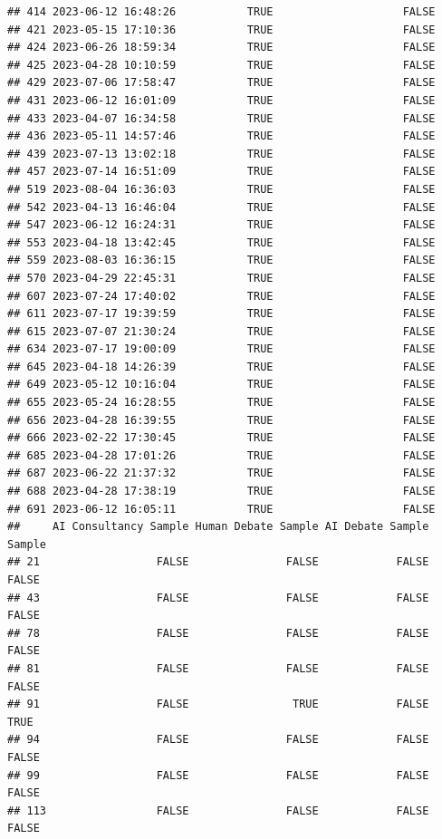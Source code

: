 \documentclass[
]{article}
\begin{document}
\begin{verbatim}
## 414 2023-06-12 16:48:26           TRUE                    FALSE
## 421 2023-05-15 17:10:36           TRUE                    FALSE
## 424 2023-06-26 18:59:34           TRUE                    FALSE
## 425 2023-04-28 10:10:59           TRUE                    FALSE
## 429 2023-07-06 17:58:47           TRUE                    FALSE
## 431 2023-06-12 16:01:09           TRUE                    FALSE
## 433 2023-04-07 16:34:58           TRUE                    FALSE
## 436 2023-05-11 14:57:46           TRUE                    FALSE
## 439 2023-07-13 13:02:18           TRUE                    FALSE
## 457 2023-07-14 16:51:09           TRUE                    FALSE
## 519 2023-08-04 16:36:03           TRUE                    FALSE
## 542 2023-04-13 16:46:04           TRUE                    FALSE
## 547 2023-06-12 16:24:31           TRUE                    FALSE
## 553 2023-04-18 13:42:45           TRUE                    FALSE
## 559 2023-08-03 16:36:15           TRUE                    FALSE
## 570 2023-04-29 22:45:31           TRUE                    FALSE
## 607 2023-07-24 17:40:02           TRUE                    FALSE
## 611 2023-07-17 19:39:59           TRUE                    FALSE
## 615 2023-07-07 21:30:24           TRUE                    FALSE
## 634 2023-07-17 19:00:09           TRUE                    FALSE
## 645 2023-04-18 14:26:39           TRUE                    FALSE
## 649 2023-05-12 10:16:04           TRUE                    FALSE
## 655 2023-05-24 16:28:55           TRUE                    FALSE
## 656 2023-04-28 16:39:55           TRUE                    FALSE
## 666 2023-02-22 17:30:45           TRUE                    FALSE
## 685 2023-04-28 17:01:26           TRUE                    FALSE
## 687 2023-06-22 21:37:32           TRUE                    FALSE
## 688 2023-04-28 17:38:19           TRUE                    FALSE
## 691 2023-06-12 16:05:11           TRUE                    FALSE
##     AI Consultancy Sample Human Debate Sample AI Debate Sample Sample
## 21                  FALSE               FALSE            FALSE  FALSE
## 43                  FALSE               FALSE            FALSE  FALSE
## 78                  FALSE               FALSE            FALSE  FALSE
## 81                  FALSE               FALSE            FALSE  FALSE
## 91                  FALSE                TRUE            FALSE   TRUE
## 94                  FALSE               FALSE            FALSE  FALSE
## 99                  FALSE               FALSE            FALSE  FALSE
## 113                 FALSE               FALSE            FALSE  FALSE

\end{verbatim}
\end{document}
